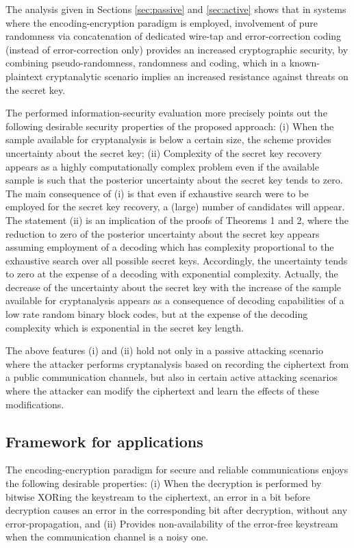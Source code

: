 \documentclass{article}[11pt]
\begin{document}
The analysis given in Sections \ref{sec:passive} and \ref{sec:active} shows
that in systems where the encoding-encryption paradigm is employed,
involvement of pure randomness via concatenation of dedicated wire-tap
and error-correction coding (instead of error-correction only)
provides an increased cryptographic security, by combining pseudo-randomness,
randomness and coding, which in a known-plaintext cryptanalytic scenario
implies an increased resistance against threats on the secret key.

The performed information-security evaluation more precisely points out
the following desirable security properties of the proposed approach:
(i) When the sample available for cryptanalysis is below a
certain size, the scheme provides uncertainty about the secret
key; (ii) Complexity of the secret key recovery appears as a
highly computationally complex problem even if the
available sample is such that the posterior uncertainty about the
secret key tends to zero. The main consequence of (i) is that even if
exhaustive search were to be employed for the secret key recovery,
a (large) number of candidates will appear. The statement
(ii) is an implication of the proofs of Theorems 1 and 2, where
the reduction to zero of the posterior uncertainty about the
secret key appears assuming employment of a decoding which has
complexity proportional to the exhaustive search over all possible
secret keys. Accordingly, the uncertainty tends to zero at the
expense of a decoding with exponential complexity. Actually, the
decrease of the uncertainty about the secret key with the increase
of the sample available for cryptanalysis appears as a consequence
of decoding capabilities of a low rate random binary block codes,
but at the expense of the decoding complexity which is exponential
in the secret key length.

The above features (i) and (ii) hold not only in a passive
attacking scenario where the attacker performs cryptanalysis based
on recording the ciphertext from a public communication channels,
but also in certain active attacking scenarios where the attacker
can modify the ciphertext and learn the effects of these
modifications.

\subsection{Framework for applications}

The encoding-encryption paradigm for secure and reliable
communications enjoys the following desirable properties: (i) When
the decryption is performed by bitwise XORing the keystream to the
ciphertext, an error in a bit before decryption causes an error in
the corresponding bit after decryption, without any
error-propagation, and (ii) Provides non-availability of the
error-free keystream when the communication channel is a noisy
one.
\end{document}
